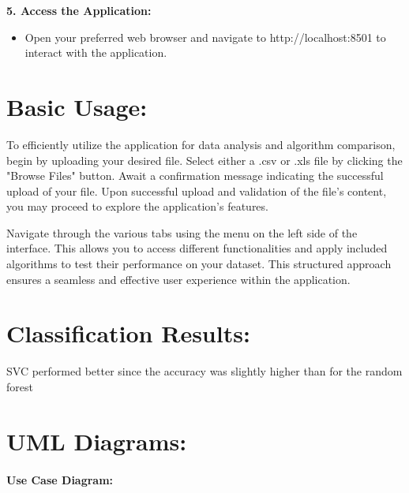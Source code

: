 \documentclass[unnumsec,webpdf,contemporary,large]{oup-authoring-template}%
\theoremstyle{thmstyleone}%
\theoremstyle{thmstyletwo}%
\theoremstyle{thmstylethree}%
\begin{document}
\textbf{5. Access the Application:}
\vspace{0.2cm}

\begin{itemize}
    \item Open your preferred web browser and navigate to http://localhost:8501 to interact with the application.
\end{itemize}
\vspace{0.2cm}

\section{Basic Usage:}\label{sec3}
\vspace{0.2cm}

To efficiently utilize the application for data analysis and algorithm comparison, begin by uploading your desired file. Select either a .csv or .xls file by clicking the "Browse Files" button. Await a confirmation message indicating the successful upload of your file. Upon successful upload and validation of the file's content, you may proceed to explore the application's features.
\vspace{0.2cm}

Navigate through the various tabs using the menu on the left side of the interface. This allows you to access different functionalities and apply included algorithms to test their performance on your dataset. This structured approach ensures a seamless and effective user experience within the application.


\section{Classification Results:}\label{sec3}
\vspace{0.2cm}

SVC performed better since the accuracy was slightly higher than for the random forest
\vspace{0.2cm}

\section{UML Diagrams:}\label{sec3}
\vspace{0.2cm}

\paragraph{Use Case Diagram:}
\vspace{0.2cm}
\end{document}

